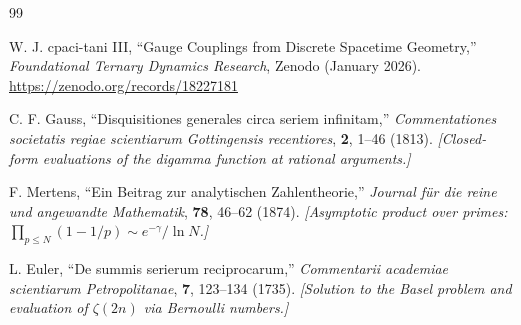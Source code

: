 \documentclass[11pt, letterpaper]{article}
\theoremstyle{definition}
\theoremstyle{remark}
\begin{document}
\begin{thebibliography}{99}

W. J. cpaci-tani III,
``Gauge Couplings from Discrete Spacetime Geometry,''
\textit{Foundational Ternary Dynamics Research}, Zenodo (January 2026).
\url{https://zenodo.org/records/18227181}

C. F. Gauss,
``Disquisitiones generales circa seriem infinitam,''
\textit{Commentationes societatis regiae scientiarum Gottingensis recentiores}, \textbf{2}, 1--46 (1813).
\newblock \textit{[Closed-form evaluations of the digamma function at rational arguments.]}

F. Mertens,
``Ein Beitrag zur analytischen Zahlentheorie,''
\textit{Journal f\"ur die reine und angewandte Mathematik}, \textbf{78}, 46--62 (1874).
\newblock \textit{[Asymptotic product over primes: $\prod_{p \leq N}(1-1/p) \sim e^{-\gamma}/\ln N$.]}

L. Euler,
``De summis serierum reciprocarum,''
\textit{Commentarii academiae scientiarum Petropolitanae}, \textbf{7}, 123--134 (1735).
\newblock \textit{[Solution to the Basel problem and evaluation of $\zeta(2n)$ via Bernoulli numbers.]}

\end{thebibliography}
\end{document}
